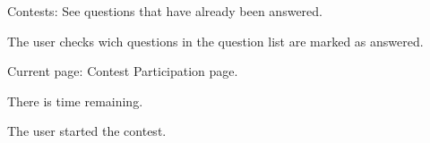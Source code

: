 \begin{uc}{Contests: See questions that have already been answered.}

    \begin{uc-mss}
    \item The user checks wich questions in the question list are marked as answered. 
    \end{uc-mss}

    \begin{uc-pre}
    \item Current page: Contest Participation page.
    \item There is time remaining. 
    \end{uc-pre}

    \begin{uc-trig}
    The user started the contest. 
    \end{uc-trig}

\end{uc}